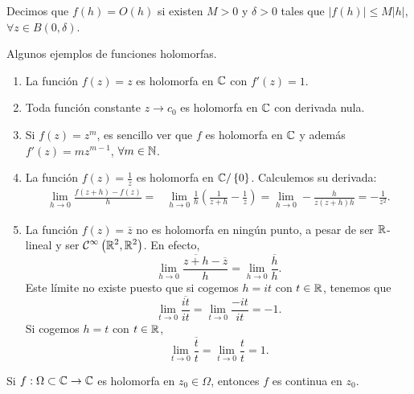 \begin{notation}
Decimos que $\displaystyle f\left(h\right)=O\left(h\right) $ si existen $\displaystyle M > 0 $ y $\displaystyle \delta >0 $ tales que  $\displaystyle \left|f\left(h\right)\right| \leq M \left|h\right| $, $\displaystyle \forall z \in B\left(0, \delta \right) $. 
\end{notation}
\begin{eg} Algunos ejemplos de funciones holomorfas. 
\begin{enumerate}
\item La función $\displaystyle f\left(z\right)=z $ es holomorfa en $\displaystyle \mathbb{C} $ con $\displaystyle f'\left(z\right)=1 $.
\item Toda función constante $\displaystyle z \to c_{0} $ es holomorfa en $\displaystyle \mathbb{C} $ con derivada nula. 
\item Si $\displaystyle f\left(z\right)=z^{m} $, es sencillo ver que $\displaystyle f $ es holomorfa en $\displaystyle \mathbb{C} $ y además $\displaystyle f'\left(z\right)=mz^{m - 1} $, $\displaystyle \forall m \in \mathbb{N} $.  
\item La función $\displaystyle f\left(z\right)= \frac{1}{z} $ es holomorfa en $\displaystyle \mathbb{C} / \left\{ 0\right\}  $. Calculemos su derivada:
	\[
	\begin{split}
		\lim_{h \to 0}\frac{f\left(z + h\right)-f\left(z\right)}{h} = & \lim_{h \to 0}\frac{1}{h}\left(\frac{1}{z+h}-\frac{1}{z}\right) =\lim_{h \to 0}-\frac{h}{z\left(z + h\right)h} = -\frac{1}{z^{2}} .
	\end{split}
	\]
\item La función $\displaystyle f\left(z\right)=\overline{z} $ no es holomorfa en ningún punto, a pesar de ser $\displaystyle \mathbb{R} $-lineal y ser $\displaystyle \mathcal{C}^{\infty }\left(\mathbb{R}^{2}, \mathbb{R}^{2}\right) $. En efecto,
	\[\lim_{h \to 0}\frac{\overline{z+h}-\overline{z}}{h} = \lim_{h \to 0}\frac{\overline{h}}{h} .\]
	Este límite no existe puesto que si cogemos $\displaystyle h = it $ con $\displaystyle t \in \mathbb{R} $, tenemos que 
	\[\lim_{t \to 0}\frac{\overline{it}}{it}=\lim_{t \to 0}\frac{-it}{it}=-1 .\]
	Si cogemos $\displaystyle h = t $ con $\displaystyle t \in \mathbb{R} $, 
	\[\lim_{t \to 0}\frac{\overline{t}}{t}=\lim_{t \to 0}\frac{t}{t}=1 .\]
\end{enumerate}
\end{eg}
\begin{prop}
Si $\displaystyle f : \Omega \subset \mathbb{C} \to \mathbb{C} $ es holomorfa en $\displaystyle z_{0} \in \Omega  $, entonces $\displaystyle f $ es continua en $\displaystyle z_{0} $. 
\end{prop}
